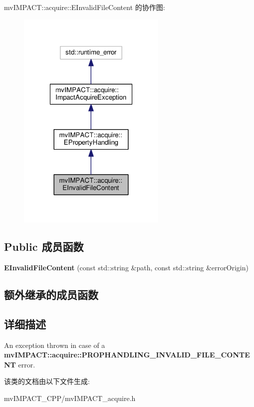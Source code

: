 mv\+I\+M\+P\+A\+C\+T\+:\+:acquire\+:\+:E\+Invalid\+File\+Content 的协作图\+:
\nopagebreak
\begin{figure}[H]
\begin{center}
\leavevmode
\includegraphics[width=202pt]{classmv_i_m_p_a_c_t_1_1acquire_1_1_e_invalid_file_content__coll__graph}
\end{center}
\end{figure}
\subsection*{Public 成员函数}
\begin{DoxyCompactItemize}
\item 
\hypertarget{classmv_i_m_p_a_c_t_1_1acquire_1_1_e_invalid_file_content_afe7cf9eadc453a81a5f8e01e446a62b8}{{\bfseries E\+Invalid\+File\+Content} (const std\+::string \&path, const std\+::string \&error\+Origin)}\label{classmv_i_m_p_a_c_t_1_1acquire_1_1_e_invalid_file_content_afe7cf9eadc453a81a5f8e01e446a62b8}

\end{DoxyCompactItemize}
\subsection*{额外继承的成员函数}


\subsection{详细描述}
An exception thrown in case of a {\bfseries mv\+I\+M\+P\+A\+C\+T\+::acquire\+::\+P\+R\+O\+P\+H\+A\+N\+D\+L\+I\+N\+G\+\_\+\+I\+N\+V\+A\+L\+I\+D\+\_\+\+F\+I\+L\+E\+\_\+\+C\+O\+N\+T\+E\+N\+T} error. 

该类的文档由以下文件生成\+:\begin{DoxyCompactItemize}
\item 
mv\+I\+M\+P\+A\+C\+T\+\_\+\+C\+P\+P/mv\+I\+M\+P\+A\+C\+T\+\_\+acquire.\+h\end{DoxyCompactItemize}
